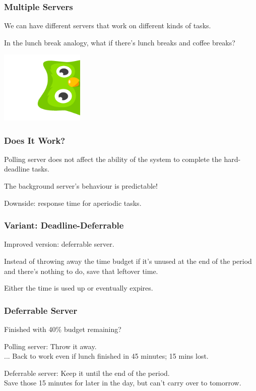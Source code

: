 \begin{frame}
\frametitle{Multiple Servers}

We can have different servers that work on different kinds of tasks.

In the lunch break analogy, what if there's lunch breaks and coffee breaks?

\hfill \includegraphics[width=0.3\textwidth]{images/duo-peeking.png}


\end{frame}

\begin{frame}
\frametitle{Does It Work?}
Polling server does not affect the ability of the system to complete the hard-deadline tasks.

The background server's behaviour is predictable!

Downside: response time for aperiodic tasks.

\end{frame}

\begin{frame}
\frametitle{Variant: Deadline-Deferrable}

Improved version: deferrable server.

Instead of throwing away the time budget if it's unused at the end of the period and there's nothing to do, save that leftover time.

Either the time is used up or eventually expires.

\end{frame}

\begin{frame}
\frametitle{Deferrable Server}
Finished with 40\% budget remaining?

Polling server: Throw it away.\\
\quad... Back to work even if lunch finished in 45 minutes; 15 mins lost.

Deferrable server: Keep it until the end of the period.\\
\quad Save those 15 minutes for later in the day, but can't carry over to tomorrow.

\end{frame}

